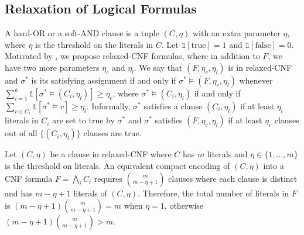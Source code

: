 \subsection*{Relaxation of Logical Formulas}

A hard-OR or a soft-AND clause is a tuple $ (C,\eta) $ with an extra parameter $ \eta $, where $ \eta $ is the threshold on the literals in $ C $. Let $ \mathds{1}[\text{true}]=1 $ and $ \mathds{1}[\text{false}]=0 $. Motivated by , we propose relaxed-CNF formulas, where in addition to $F$, we have two more parameters $\eta_c$ and $\eta_l$. We say that $(F,\eta_c, \eta_l)$ is in relaxed-CNF and $ \sigma^* $ is its satisfying assignment if and only if $\sigma^* \models (F,\eta_c, \eta_l)$ whenever $\sum_{i=1}^k \mathds{1}[\sigma^* \models (C_i,\eta_l)] \ge \eta_c$, where $\sigma^* \models (C_i, \eta_l)$ if and only if $\sum_{v \in C_i} \mathds{1}[\sigma^* \models v] \geq \eta_l$. Informally,  $\sigma^*$ satisfies a clause $(C_i, \eta_l)$ if  at least $\eta_l$ literals in $C_i$ are set to true by $\sigma^*$ and $\sigma^*$ satisfies $(F,\eta_c, \eta_l)$ if at least $\eta_c$  clauses out of all $\{(C_i,\eta_l)\}$ clauses are true. 


\begin{theorem}
	\label{interpretability_crr_thm:succinctness}	
	Let $ (C,\eta) $ be a clause in relaxed-CNF where  $ C $ has $ m  $ literals and $ \eta \in \{1,\dots,m\} $ is the threshold on literals.  An equivalent compact encoding of $ (C,\eta) $  into a CNF formula $ F= \bigwedge_i C_i $ requires $ {m \choose{m-\eta+1}} $  clauses where each clause is distinct and has $ m-\eta+1 $ literals of $ (C,\eta) $. Therefore,  the total number of literals in $ F $ is $ (m-\eta+1){m\choose{m-\eta+1}} = m $ when $ \eta=1 $, otherwise $ (m-\eta+1){m\choose{m-\eta+1}} > m $.
\end{theorem}



